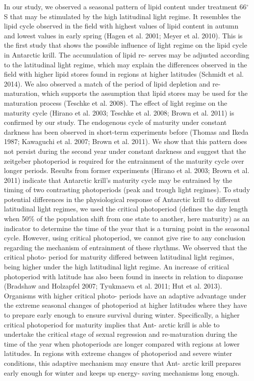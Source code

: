 In our study, we observed a seasonal pattern of lipid content under treatment 66$^{\circ}$S that may be stimulated by the high latitudinal light regime. It resembles the lipid cycle observed in the field with highest values of lipid content in autumn and lowest values in early spring (Hagen et al. 2001; Meyer et al. 2010). This is the first study that shows the possible influence of light regime on the lipid cycle in Antarctic krill. The accumulation of lipid re- serves may be adjusted according to the latitudinal light regime, which may explain the differences observed in the field with higher lipid stores found in regions at higher latitudes (Schmidt et al. 2014). We also observed a match of the period of lipid depletion and re-maturation, which supports the assumption that lipid stores may be used for the maturation process (Teschke et al. 2008). 
The effect of light regime on the maturity cycle (Hirano et al. 2003; Teschke et al. 2008; Brown et al. 2011) is confirmed by our study. The endogenous cycle of maturity under constant darkness has been observed in short-term experiments before (Thomas and Ikeda 1987; Kawaguchi et al. 2007; Brown et al. 2011). We show that this pattern does not persist during the second year under constant darkness and suggest that the zeitgeber photoperiod is required for the entrainment of the maturity cycle over longer periods. Results from former experiments (Hirano et al. 2003; Brown et al. 2011) indicate that Antarctic krill’s maturity cycle may be entrained by the timing of two contrasting photoperiods (peak and trough light regimes). 
To study potential differences in the physiological response of Antarctic krill to different latitudinal light regimes, we used the critical photoperiod (defines the day length when 50\% of the population shift from one state to another, here maturity) as an indicator to determine the time of the year that is a turning point in the seasonal cycle. However, using critical photoperiod, we cannot give rise to any conclusion regarding the mechanism of entrainment of these rhythms. We observed that the critical photo- period for maturity differed between latitudinal light regimes, being higher under the high latitudinal light regime. An increase of critical photoperiod with latitude has also been found in insects in relation to diapause (Bradshaw and Holzapfel 2007; Tyukmaeva et al. 2011; Hut et al. 2013). Organisms with higher critical photo- periods have an adaptive advantage under the extreme seasonal changes of photoperiod at higher latitudes where they have to prepare early enough to ensure survival during winter. Specifically, a higher critical photoperiod for maturity implies that Ant- arctic krill is able to undertake the critical stage of sexual regression and re-maturation during the time of the year when photoperiods are longer compared with regions at lower latitudes. In regions with extreme changes of photoperiod and severe winter conditions, this adaptive mechanism may ensure that Ant- arctic krill prepares early enough for winter and keeps up energy- saving mechanisms long enough. 
